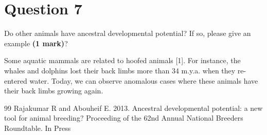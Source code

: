 \documentclass[letterpaper,12pt]{article}
\newenvironment{myindentpar}[1]%
{\begin{list}{}%
          {\setlength{\leftmargin}{#1}}%
          \item[]%
}
{\end{list}}
\begin{document}
\section*{Question 7}

Do other animals have ancestral developmental potential? If so, please give an example \textbf{(1 mark)}?
\vspace*{10px}

\begin{myindentpar}{0.5cm}
Some aquatic mammals are related to hoofed animals [1]. For instance, the whales and dolphins lost their back limbs more than 34 m.y.a. when they re-entered water. Today, we can observe anomalous cases where these animals have their back limbs growing again.
\end{myindentpar}


\begin{thebibliography}{99}
Rajakumar R and Abouheif E. 2013. Ancestral developmental potential: a new tool for animal breeding? Proceeding of the 62nd Annual National Breeders Roundtable. In Press
\end{thebibliography}
\end{document}
